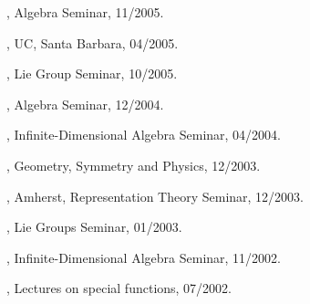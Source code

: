 \documentclass[11pt]{amsart}
\theoremstyle{plain}
\theoremstyle{definition}
\theoremstyle{remark}
\begin{document}
, Algebra Seminar,
11/2005.

, UC, Santa Barbara, 04/2005.

, Lie Group Seminar, 10/2005.

, Algebra Seminar, 12/2004.


, Infinite-Dimensional Algebra Seminar, 04/2004.

, Geometry, Symmetry and Physics,
12/2003.

, Amherst,
Representation Theory
          Seminar, 12/2003.

, Lie Groups Seminar, 01/2003.



, Infinite-Dimensional Algebra Seminar,
11/2002.

, Lectures on special
functions, 07/2002.

\medskip

\newpage
\end{document}
